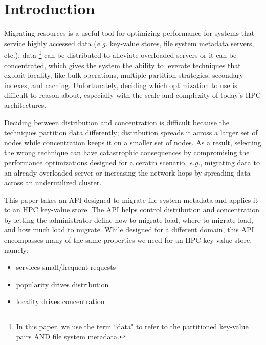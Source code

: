\section{Introduction}

Migrating resources is a useful tool for optimizing performance for systems
that service highly accessed data ({\it e.g.} key-value stores, file system
metadata servers, etc.); data \footnote{In this paper, we use the term ``data"
to refer to the partitioned key-value pairs AND file system metadata.} can be
distributed to alleviate overloaded servers or it can be concentrated, which
gives the system the ability to leverate techniques that exploit locality, like
bulk operations, multiple partition strategies,  secondary indexes, and
caching.  Unfortunately, deciding which optimization to use is difficult to
reason about, especially with the scale and complexity of today's HPC
architectures. 

Deciding between distribution and concentration is difficult because the
techniques partition data differently; distribution spreads it across a larger
set of nodes while concentration keeps it on a smaller set of nodes.  As a
result, selecting the wrong technique can have catastrophic consequences by
compromising the performance optimizations designed for a ceratin scenario,
{\it e.g.}, migrating data to an already overloaded server or increasing the
network hops by spreading data across an underutilized cluster.

This paper takes an API designed to migrate file system metadata and applies it
to an HPC key-value store.  The API helps control distribution and
concentration by letting the administrator define how to migrate load, where to
migrate load, and how much load to migrate. While designed for a different
domain, this API encompasses many of the same properties we need for an HPC
key-value store, namely:

\begin{itemize}
  \item services small/frequent requests
  \item popularity drives distribution
  \item locality drives concentration
\end{itemize}

